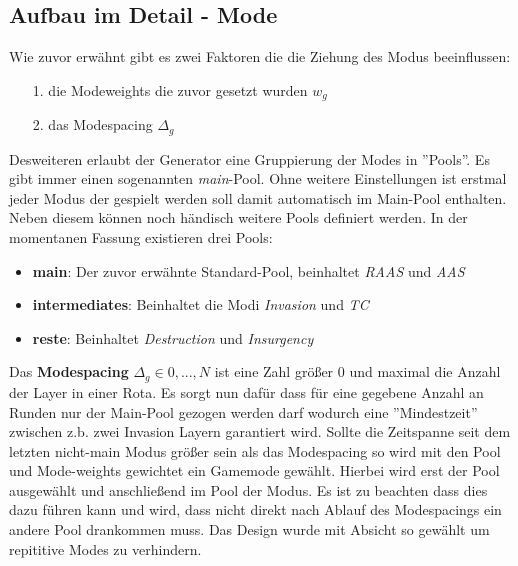     \subsection{Aufbau im Detail - Mode}
        Wie zuvor erwähnt gibt es zwei Faktoren die die Ziehung des Modus beeinflussen:
        \begin{itemize}
            \item [1.] die Modeweights die zuvor gesetzt wurden $w_g$ 
            \item [2.] das Modespacing $\Delta_g$
        \end{itemize}
        Desweiteren erlaubt der Generator eine Gruppierung der Modes in ''Pools''. 
        Es gibt immer einen sogenannten \textit{main}-Pool. 
        Ohne weitere Einstellungen ist erstmal jeder Modus der gespielt werden soll damit automatisch im Main-Pool enthalten. 
        Neben diesem können noch händisch weitere Pools definiert werden. 
        In der momentanen Fassung existieren drei Pools:
        \begin{itemize}
            \item \textbf{main}: Der zuvor erwähnte Standard-Pool, beinhaltet \textit{RAAS} und \textit{AAS}
            \item \textbf{intermediates}: Beinhaltet die Modi \textit{Invasion} und \textit{TC}
            \item \textbf{reste}: Beinhaltet \textit{Destruction} und \textit{Insurgency}
        \end{itemize}
        Das \textbf{Modespacing} $\Delta_g\in{0,...,N}$ ist eine Zahl größer $0$ und maximal die Anzahl der Layer in einer Rota.
        Es sorgt nun dafür dass für eine gegebene Anzahl an Runden nur der Main-Pool gezogen werden darf wodurch eine ''Mindestzeit'' zwischen z.b. zwei Invasion Layern garantiert wird.
        Sollte die Zeitspanne seit dem letzten nicht-main Modus größer sein als das Modespacing so wird mit den Pool und Mode-weights gewichtet ein Gamemode gewählt. 
        Hierbei wird erst der Pool ausgewählt und anschließend im Pool der Modus. 
        Es ist zu beachten dass dies dazu führen kann und wird, dass nicht direkt nach Ablauf des Modespacings ein andere Pool drankommen muss. 
        Das Design wurde mit Absicht so gewählt um repititive Modes zu verhindern.

